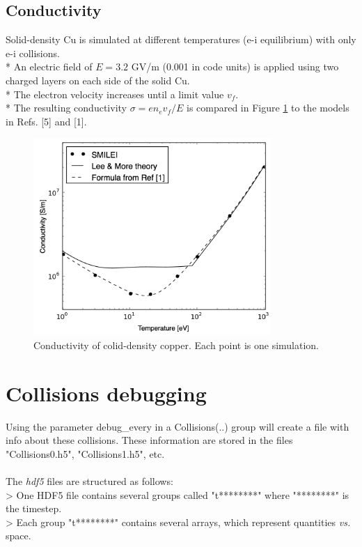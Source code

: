 \documentclass[11pt]{article}
\newcommand{\code}[1]{\colorbox{yellow!15}{\ttfamily #1}}
\begin{document}
\subsection{Conductivity}
Solid-density Cu is simulated at different temperatures (e-i equilibrium) with only e-i collisions.\\*
An electric field of $E=3.2$ GV/m (0.001 in code units) is applied using two charged layers on each side of the solid Cu.\\*
The electron velocity increases until a limit value $v_f$.\\*
The resulting conductivity $\sigma=en_ev_f/E$ is compared in Figure \ref{conductivity} to the models in Refs. [5] and [1].

\begin{figure}[h]
\centering
\includegraphics[width=9cm]{conductivity}
\caption{Conductivity of colid-density copper. Each point is one simulation.}
\label{conductivity}
\end{figure}



\clearpage

\section{Collisions debugging\label{sec:debug}}

Using the parameter \code{debug\_every} in a \code{Collisions(..)} group will create a file with info about these
collisions. These information are stored in the files "Collisions0.h5", "Collisions1.h5", etc.\\
\\
The \emph{hdf5} files are structured as follows:\\
> One HDF5 file contains several groups called "t********" where "********" is the timestep.\\
> Each group "t********" contains several arrays, which represent quantities \emph{vs.} space.\\
\end{document}
